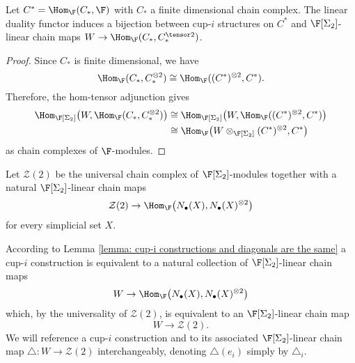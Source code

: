 \begin{lemma} \label{lemma: cup-i constructions and diagonals are the same}
	Let $C^* = \Hom_{\F}(C_*, \F)$ with $C_*$ a finite dimensional chain complex. The linear duality functor induces a bijection between cup-$i$ structures on $C^*$ and $\F[\Sigma_2]$-linear chain maps $W \to \Hom_{\F}(C_*, C_*^{\tensor 2})$.
\end{lemma}

\begin{proof}
	Since $C_\ast$ is finite dimensional, we have
	\[
	\Hom_{\F}(C_\ast, C_\ast^{\otimes 2}) \cong \Hom_{\F}((C^\ast)^{\otimes 2}, C^\ast).
	\]
	Therefore, the hom-tensor adjunction gives
	\begin{align*}
	\Hom_{\F[\Sigma_2]}\big(W, \Hom_{\F}(C_\ast, C_\ast^{\otimes 2}) \big) & \cong
	\Hom_{\F[\Sigma_2]}\big(W, \Hom_{\F}((C^\ast)^{\otimes 2}, C^\ast) \big) \\ & \cong
	\Hom_{\F} \big(W \otimes_{\F[\Sigma_2]} (C^\ast)^{\otimes 2}, C^\ast \big)
	\end{align*}
	as chain complexes of $\F$-modules.
\end{proof}

\begin{definition}
	Let $\mathcal Z(2)$ be the universal chain complex of $\F[\Sigma_2]$-modules together with a natural $\F[\Sigma_2]$-linear chain maps
	\[
	\mathcal Z(2) \to \Hom_{\F}\big( N_\bullet(X), N_\bullet(X)^{\otimes 2} \big)
	\]
	for every simplicial set $X$.
\end{definition}

According to Lemma \ref{lemma: cup-i constructions and diagonals are the same} a cup-$i$ construction is equivalent to a natural collection of $\F[\Sigma_2]$-linear chain maps
\[
W \to \Hom_{\F}\big( N_\bullet(X), N_\bullet(X)^{\otimes 2} \big)
\]
which, by the universality of $\mathcal Z(2)$, is equivalent to an $\F[\Sigma_2]$-linear chain map
\[
W \to \mathcal Z(2).
\]
We will reference a cup-$i$ construction and to its associated $\F[\Sigma_2]$-linear chain map $\triangle \colon W \to \mathcal Z(2)$ interchangeably, denoting $\triangle(e_i)$ simply by $\triangle_i$.


